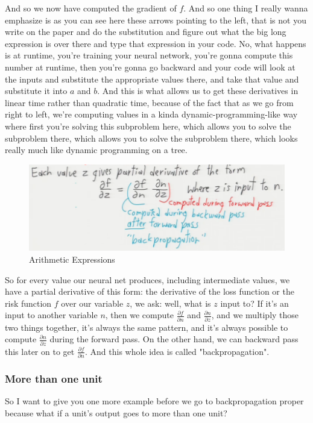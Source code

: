 \documentclass[fleqn,10pt]{olplainarticle}
\theoremstyle{definition}
\theoremstyle{remark}
\begin{document}
And so we now have computed the gradient of $f$. And so one thing I really wanna emphasize is as you can see here these arrows pointing to the left, that is not you write on the paper and do the substitution and figure out what the big long expression is over there and type that expression in your code. No, what happens is at runtime, you're training your neural network, you're gonna compute this number at runtime, then you're gonna go backward and your code will look at the inputs and substitute the appropriate values there, and take that value and substitute it into $a$ and $b$. And this is what allows us to get these derivatives in linear time rather than quadratic time, because of the fact that as we go from right to left, we're computing values in a kinda dynamic-programming-like way where first you're solving this subproblem here, which allows you to solve the subproblem there, which allows you to solve the subproblem there, which looks really much like dynamic programming on a tree. 
\begin{figure}[ht]
\centering
\includegraphics[width=0.6\linewidth]{images/arithmetic_expression_11}
\caption{Arithmetic Expressions}
\label{fig:arithmetic_expression_11}
\end{figure}

So for every value our neural net produces, including intermediate values, we have a partial derivative of this form: the derivative of the loss function or the risk function $f$ over our variable $z$, we ask: well, what is $z$ input to? If it's an input to another variable $n$, then we compute $\frac{\partial f}{\partial n}$ and $\frac{\partial n}{\partial z}$, and we multiply those two things together, it's always the same pattern, and it's always possible to compute $\frac{\partial n}{\partial z}$ during the forward pass. On the other hand, we can backward pass this later on to get $\frac{\partial f}{\partial n}$. And this whole idea is called "backpropagation".
\clearpage

\subsubsection*{More than one unit}
So I want to give you one more example before we go to backpropagation proper because what if a unit's output goes to more than one unit?
\end{document}
